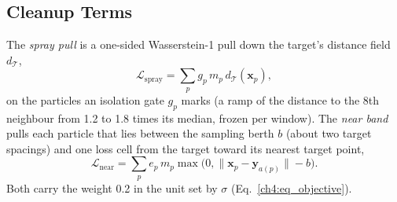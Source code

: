 \subsection{Cleanup Terms}
\label{ch4:sec_cleanup}
The \emph{spray pull} is a one-sided Wasserstein-1 pull down the target's distance field $d_{\mathcal{T}}$,
\begin{equation}
\label{ch4:eq_spray}
\mathcal{L}_{\mathrm{spray}}=\sum_p g_p\, m_p\, d_{\mathcal{T}}(\mathbf{x}_p),
\end{equation}
on the particles an isolation gate $g_p$ marks (a ramp of the distance to the 8th neighbour from 1.2 to 1.8 times its
median, frozen per window). The \emph{near band} pulls each particle that lies between the sampling berth $b$ (about two
target spacings) and one loss cell from the target toward its nearest target point,
\begin{equation}
\label{ch4:eq_near}
\mathcal{L}_{\mathrm{near}}=\sum_p e_p\, m_p\max\big(0,\lVert\mathbf{x}_p-\mathbf{y}_{a(p)}\rVert-b\big).
\end{equation}
Both carry the weight 0.2 in the unit set by $\sigma$ (Eq.~\eqref{ch4:eq_objective}).

